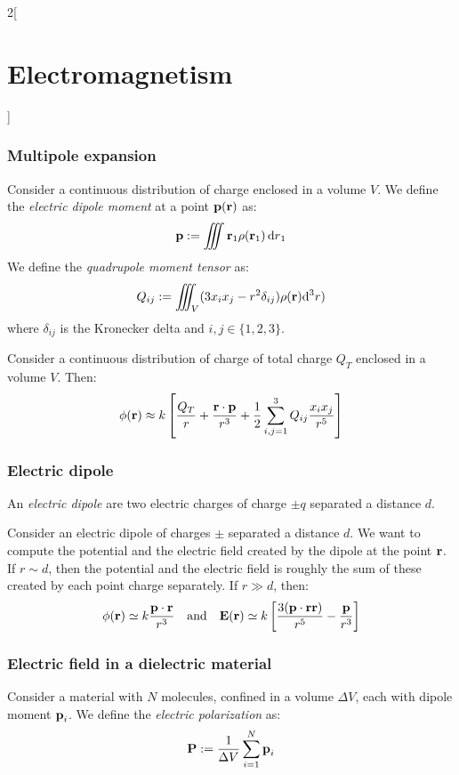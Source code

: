 \documentclass[../../../main_physics.tex]{subfiles}
\begin{document}
\begin{multicols}{2}[\section{Electromagnetism}]
  \subsubsection{Multipole expansion}
  \begin{definition}
    Consider a continuous distribution of charge enclosed in a volume $V$. We define the \emph{electric dipole moment} at a point $\boldsymbol{\mathrm{p}}(\boldsymbol{\mathrm{r}})$ as: $$\boldsymbol{\mathrm{p}}:=\iiint\boldsymbol{\mathrm{r}}_1\rho(\boldsymbol{\mathrm{r}}_1)\dd{r}_1$$
    We define the \emph{quadrupole moment tensor} as: $$Q_{ij}:=\iiint_V(3x_ix_j-r^2\delta_{ij})\rho(\boldsymbol{\mathrm{r}})\dd^3 r)$$ where $\delta_{ij}$ is the Kronecker delta and $i,j\in\{1,2,3\}$.
  \end{definition}
  \begin{proposition}
    Consider a continuous distribution of charge of total charge $Q_T$ enclosed in a volume $V$. Then:
    $$\phi(\boldsymbol{\mathrm{r}})\approx k\left[\frac{Q_T}{r}+\frac{\boldsymbol{\mathrm{r}}\cdot\boldsymbol{\mathrm{p}}}{r^3}+\frac{1}{2}\sum_{i,j=1}^3Q_{ij}\frac{x_ix_j}{r^5}\right]$$
  \end{proposition}
  \subsubsection{Electric dipole}
  \begin{definition}
    An \emph{electric dipole} are two electric charges of charge $\pm q$ separated a distance $d$.
  \end{definition}
  \begin{proposition}
    Consider an electric dipole of charges $\pm$ separated a distance $d$. We want to compute the potential and the electric field created by the dipole at the point $\boldsymbol{\mathrm{r}}$. If $r\sim d$, then the potential and the electric field is roughly the sum of these created by each point charge separately. If $r\gg d$, then:
    $$\phi(\boldsymbol{\mathrm{r}})\simeq k\frac{\boldsymbol{\mathrm{p}}\cdot \boldsymbol{\mathrm{r}}}{r^3}\quad\text{and}\quad \boldsymbol{\mathrm{E}}(\boldsymbol{\mathrm{r}})\simeq k\left[\frac{3(\boldsymbol{\mathrm{p}}\cdot \boldsymbol{\mathrm{r}}\boldsymbol{\mathrm{r}})}{r^5}-\frac{\boldsymbol{\mathrm{p}}}{r^3}\right]$$
  \end{proposition}
  \subsubsection{Electric field in a dielectric material}
  \begin{definition}
    Consider a material with $N$ molecules, confined in a volume $\Delta V$, each with dipole moment $\boldsymbol{\mathrm{p}}_i$. We define the \emph{electric polarization} as: $$\boldsymbol{\mathrm{P}}:=\frac{1}{\Delta V}\sum_{i=1}^N\boldsymbol{\mathrm{p}}_i$$
  \end{definition}
\end{multicols}
\end{document}
